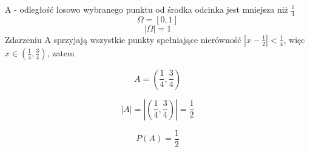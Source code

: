 \medskip
{} 
\medskip

A - odległość losowo wybranego punktu od środka odcinka jest mniejsza niż $\frac{1}{4}$
\[
\Omega=[0, 1]
\]
\[
|\Omega|=1
\]
Zdarzeniu A sprzyjają wszystkie punkty spełniające nierówność
$|x - \frac{1}{2}| < \frac{1}{4}$, więc $x \in(\frac{1}{4}, \frac{3}{4})$, zatem 

\[
A = (\frac{1}{4}, \frac{3}{4})
\]

\[
|A| = |(\frac{1}{4}, \frac{3}{4})| = \frac{1}{2}
\]

\[
P(A) = \frac{1}{2}
\]
